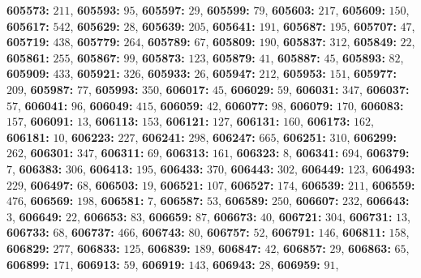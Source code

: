\textsf{\bfseries 605573:} $211$, \textsf{\bfseries 605593:} $95$, \textsf{\bfseries 605597:} $29$, \textsf{\bfseries 605599:} $79$, \textsf{\bfseries 605603:} $217$, \textsf{\bfseries 605609:} $150$, \textsf{\bfseries 605617:} $542$, \textsf{\bfseries 605629:} $28$, \textsf{\bfseries 605639:} $205$, \textsf{\bfseries 605641:} $191$, \textsf{\bfseries 605687:} $195$, \textsf{\bfseries 605707:} $47$, \textsf{\bfseries 605719:} $438$, \textsf{\bfseries 605779:} $264$, \textsf{\bfseries 605789:} $67$, \textsf{\bfseries 605809:} $190$, \textsf{\bfseries 605837:} $312$, \textsf{\bfseries 605849:} $22$, \textsf{\bfseries 605861:} $255$, \textsf{\bfseries 605867:} $99$, \textsf{\bfseries 605873:} $123$, \textsf{\bfseries 605879:} $41$, \textsf{\bfseries 605887:} $45$, \textsf{\bfseries 605893:} $82$, \textsf{\bfseries 605909:} $433$, \textsf{\bfseries 605921:} $326$, \textsf{\bfseries 605933:} $26$, \textsf{\bfseries 605947:} $212$, \textsf{\bfseries 605953:} $151$, \textsf{\bfseries 605977:} $209$, \textsf{\bfseries 605987:} $77$, \textsf{\bfseries 605993:} $350$, \textsf{\bfseries 606017:} $45$, \textsf{\bfseries 606029:} $59$, \textsf{\bfseries 606031:} $347$, \textsf{\bfseries 606037:} $57$, \textsf{\bfseries 606041:} $96$, \textsf{\bfseries 606049:} $415$, \textsf{\bfseries 606059:} $42$, \textsf{\bfseries 606077:} $98$, \textsf{\bfseries 606079:} $170$, \textsf{\bfseries 606083:} $157$, \textsf{\bfseries 606091:} $13$, \textsf{\bfseries 606113:} $153$, \textsf{\bfseries 606121:} $127$, \textsf{\bfseries 606131:} $160$, \textsf{\bfseries 606173:} $162$, \textsf{\bfseries 606181:} $10$, \textsf{\bfseries 606223:} $227$, \textsf{\bfseries 606241:} $298$, \textsf{\bfseries 606247:} $665$, \textsf{\bfseries 606251:} $310$, \textsf{\bfseries 606299:} $262$, \textsf{\bfseries 606301:} $347$, \textsf{\bfseries 606311:} $69$, \textsf{\bfseries 606313:} $161$, \textsf{\bfseries 606323:} $8$, \textsf{\bfseries 606341:} $694$, \textsf{\bfseries 606379:} $7$, \textsf{\bfseries 606383:} $306$, \textsf{\bfseries 606413:} $195$, \textsf{\bfseries 606433:} $370$, \textsf{\bfseries 606443:} $302$, \textsf{\bfseries 606449:} $123$, \textsf{\bfseries 606493:} $229$, \textsf{\bfseries 606497:} $68$, \textsf{\bfseries 606503:} $19$, \textsf{\bfseries 606521:} $107$, \textsf{\bfseries 606527:} $174$, \textsf{\bfseries 606539:} $211$, \textsf{\bfseries 606559:} $476$, \textsf{\bfseries 606569:} $198$, \textsf{\bfseries 606581:} $7$, \textsf{\bfseries 606587:} $53$, \textsf{\bfseries 606589:} $250$, \textsf{\bfseries 606607:} $232$, \textsf{\bfseries 606643:} $3$, \textsf{\bfseries 606649:} $22$, \textsf{\bfseries 606653:} $83$, \textsf{\bfseries 606659:} $87$, \textsf{\bfseries 606673:} $40$, \textsf{\bfseries 606721:} $304$, \textsf{\bfseries 606731:} $13$, \textsf{\bfseries 606733:} $68$, \textsf{\bfseries 606737:} $466$, \textsf{\bfseries 606743:} $80$, \textsf{\bfseries 606757:} $52$, \textsf{\bfseries 606791:} $146$, \textsf{\bfseries 606811:} $158$, \textsf{\bfseries 606829:} $277$, \textsf{\bfseries 606833:} $125$, \textsf{\bfseries 606839:} $189$, \textsf{\bfseries 606847:} $42$, \textsf{\bfseries 606857:} $29$, \textsf{\bfseries 606863:} $65$, \textsf{\bfseries 606899:} $171$, \textsf{\bfseries 606913:} $59$, \textsf{\bfseries 606919:} $143$, \textsf{\bfseries 606943:} $28$, \textsf{\bfseries 606959:} $91$, 
